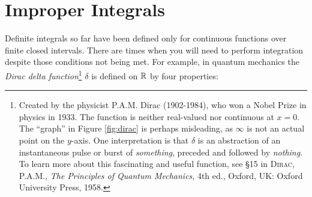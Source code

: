 {\begin{enumerate}[\bfseries 1.]
\end{enumerate}
}
\newpage
\section{Improper Integrals}
Definite integrals so far have been defined only for continuous functions over
finite closed intervals. There are times when you will need to perform
integration despite those conditions not being met. For example, in quantum
mechanics the \emph{Dirac delta function}\footnote{Created by the physicist P.A.M. Dirac (1902-1984), who won a
Nobel Prize in physics in 1933. The function is neither real-valued nor
continuous at $x=0$. The ``graph'' in Figure \ref{fig:dirac} is perhaps
misleading, as $\infty$ is not an actual point on the $y$-axis. One
interpretation is that $\delta$ is an abstraction of an instantaneous pulse or
burst of \emph{something}, preceded and followed by \emph{nothing}.
To learn more about this fascinating and useful function, see \S 15 in
\textsc{Dirac, P.A.M.}, \emph{The Principles of Quantum Mechanics}, 4th ed.,
Oxford, UK: Oxford University Press, 1958.} $\delta$ is defined on $\mathbb{R}$ by
four properties:

